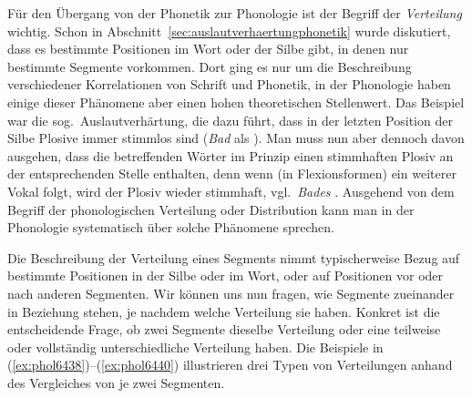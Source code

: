 Für den Übergang von der Phonetik zur Phonologie ist der Begriff der \textit{Verteilung} wichtig.
Schon in Abschnitt~\ref{sec:auslautverhaertungphonetik} wurde diskutiert, dass es bestimmte Positionen im Wort oder der Silbe gibt, in denen nur bestimmte Segmente vorkommen.
Dort ging es nur um die Beschreibung verschiedener Korrelationen von Schrift und Phonetik, in der Phonologie haben einige dieser Phänomene aber einen hohen theoretischen Stellenwert.
Das Beispiel war die sog.\ Auslautverhärtung, die dazu führt, dass in der letzten Position der Silbe Plosive immer stimmlos sind (\textit{Bad} als \textipa{[ba:t]}).
Man muss nun aber dennoch davon ausgehen, dass die betreffenden Wörter im Prinzip einen stimmhaften Plosiv an der entsprechenden Stelle enthalten, denn wenn (\zB in Flexionsformen) ein weiterer Vokal folgt, wird der Plosiv wieder stimmhaft, vgl.\ \textit{Bades} \textipa{[ba:d@s]}.
Ausgehend von dem Begriff der phonologischen Verteilung oder Distribution kann man in der Phonologie systematisch über solche Phänomene sprechen.


Die Beschreibung der Verteilung eines Segments nimmt typischerweise Bezug auf bestimmte Positionen in der Silbe oder im Wort, oder auf Positionen vor oder nach anderen Segmenten.
Wir können uns nun fragen, wie Segmente zueinander in Beziehung stehen, je nachdem welche Verteilung sie haben.
Konkret ist die entscheidende Frage, ob zwei Segmente dieselbe Verteilung oder eine teilweise oder vollständig unterschiedliche Verteilung haben.
Die Beispiele in (\ref{ex:phol6438})--(\ref{ex:phol6440}) illustrieren drei Typen von Verteilungen anhand des Vergleiches von je zwei Segmenten.

